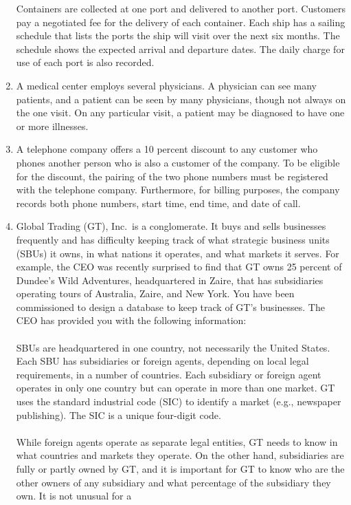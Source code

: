\documentclass[
]{article}
\begin{document}
\begin{enumerate}
  Containers are collected at one port and delivered to another port.
  Customers pay a negotiated fee for the delivery of each container.
  Each ship has a sailing schedule that lists the ports the ship will
  visit over the next six months. The schedule shows the expected
  arrival and departure dates. The daily charge for use of each port
  is also recorded.
\item
  A medical center employs several physicians. A physician can see
  many patients, and a patient can be seen by many physicians, though
  not always on the one visit. On any particular visit, a patient may
  be diagnosed to have one or more illnesses.
\item
  A telephone company offers a 10 percent discount to any customer who
  phones another person who is also a customer of the company. To be
  eligible for the discount, the pairing of the two phone numbers must
  be registered with the telephone company. Furthermore, for billing
  purposes, the company records both phone numbers, start time, end
  time, and date of call.
\item
  Global Trading (GT), Inc.~is a conglomerate. It buys and sells
  businesses frequently and has difficulty keeping track of what
  strategic business units (SBUs) it owns, in what nations it
  operates, and what markets it serves. For example, the CEO was
  recently surprised to find that GT owns 25 percent of Dundee's Wild
  Adventures, headquartered in Zaire, that has subsidiaries operating
  tours of Australia, Zaire, and New York. You have been commissioned
  to design a database to keep track of GT's businesses. The CEO has
  provided you with the following information:\\
  ~\\
  SBUs are headquartered in one country, not necessarily the United
  States. Each SBU has subsidiaries or foreign agents, depending on
  local legal requirements, in a number of countries. Each subsidiary
  or foreign agent operates in only one country but can operate in
  more than one market. GT uses the standard industrial code (SIC) to
  identify a market (e.g., newspaper publishing). The SIC is a unique
  four-digit code.\\
  ~\\
  While foreign agents operate as separate legal entities, GT needs to
  know in what countries and markets they operate. On the other hand,
  subsidiaries are fully or partly owned by GT, and it is important
  for GT to know who are the other owners of any subsidiary and what
  percentage of the subsidiary they own. It is not unusual for a

\end{enumerate}
\end{document}
